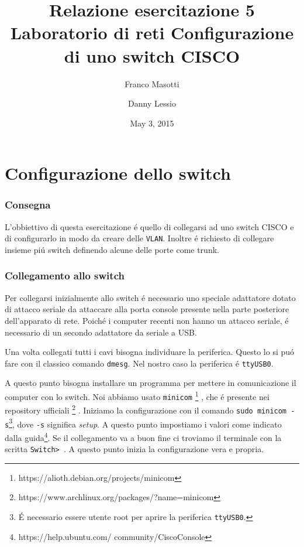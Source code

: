 \documentclass[9pt, a4paper, oneside]{article}
\title{Relazione esercitazione 5 Laboratorio di reti\newline
Configurazione di uno switch CISCO}
\author{Franco Masotti \and Danny Lessio}
\date{May 3, 2015}
\begin{document}
	\maketitle
	\tableofcontents
	\newpage
	\part{Configurazione dello switch}
		\section{Consegna}
			\par
				L'obbiettivo di questa esercitazione \'e quello 
				di collegarsi ad uno switch CISCO e di 
				configurarlo in modo da creare delle 
				\texttt{VLAN}. Inoltre \'e richiesto di 
				collegare insieme pi\'u switch definendo 
				alcune delle porte come trunk.
		\section{Collegamento allo switch}
			\par
				Per collegarsi inizialmente allo switch \'e 
				necessario uno speciale adattatore dotato di 
				attacco seriale da attaccare alla porta 
				console presente nella parte posteriore 
				dell'apparato di rete. Poich\'e i computer  
				recenti non hanno un attacco seriale, \'e 
				necessario di un secondo adattatore da seriale 
				a USB.
			\par
				Una volta collegati tutti i cavi bisogna 
				individuare la periferica. Questo lo si pu\'o 
				fare con il classico comando \texttt{dmesg}. 
				Nel nostro caso la periferica \'e 
				\texttt{ttyUSB0}.
			\par
				A questo punto bisogna installare un programma 
				per mettere in comunicazione il computer con 
				lo switch. Noi abbiamo usato 
				\texttt{minicom}
				\footnote{https://alioth.debian.org/projects/minicom}
				, che \'e presente nei repository 
				ufficiali
				\footnote{https://www.archlinux.org/packages/?name=minicom}
				. Iniziamo la configurazione con 
				il comando
				\texttt{sudo minicom -s}\footnote{\'E
				necessario essere utente root per aprire la
				periferica \texttt{ttyUSB0}.}, dove \texttt{-s} 
				significa \emph{setup}. A questo punto 
				impostiamo i valori come indicato dalla 
				guida\footnote{https://help.ubuntu.com/
				community/CiscoConsole}. Se il collegamento va 
				a buon fine ci troviamo il terminale con la 
				scritta \texttt{Switch> }. A questo punto 
				inizia la configurazione vera e propria.
\end{document}
